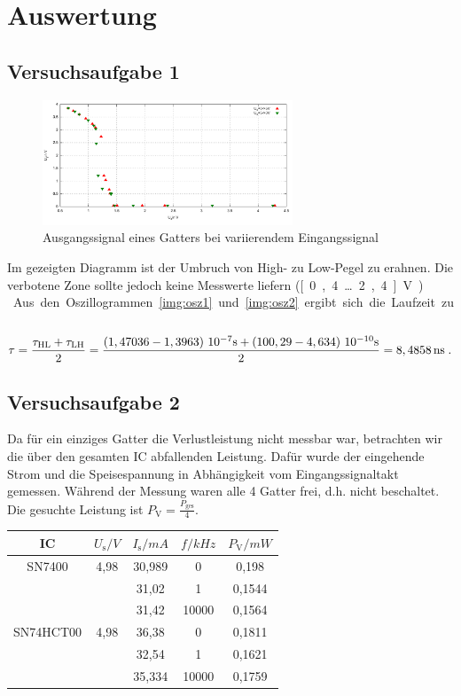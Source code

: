 \documentclass[numbers=noenddot,12pt,a4paper]{scrartcl}
\newcommand{\ix}[1]{_\text{#1}}
\begin{document}
\section{Auswertung}
\subsection{Versuchsaufgabe 1}
\begin{figure}[H]
\centering
\includegraphics[width=0.666\textwidth]{aufg1.pdf}
\caption{Ausgangssignal eines Gatters bei variierendem Eingangssignal}
\end{figure}
Im gezeigten Diagramm ist der Umbruch von High- zu Low-Pegel zu erahnen. Die verbotene Zone sollte jedoch keine Messwerte liefern (\unit[0,4\dots 2,4]{V}). \\
Aus den Oszillogrammen \ref{img:osz1} und \ref{img:osz2} ergibt sich die Laufzeit zu
\begin{align*}
\tau=\frac{\tau\ix{HL}+\tau\ix{LH}}{2}=\frac{\unit[\left(1,47036-1,3963\right)]{10^{-7}s}+\unit[\left(100,29-4,634\right)]{10^{-10}s}}{2}=\unit[8,4858]{ns} \; .
\end{align*}
\subsection{Versuchsaufgabe 2}
Da für ein einziges Gatter die Verlustleistung nicht messbar war, betrachten wir die über den gesamten IC abfallenden Leistung. Dafür wurde der eingehende Strom und die Speisespannung in Abhängigkeit vom Eingangssignaltakt gemessen. Während der Messung waren alle 4 Gatter frei, d.h. nicht beschaltet. Die gesuchte Leistung ist $P\ix{V}=\frac{P\ix{ges}}{4}$.
\begin{table}[H]
\centering
\begin{tabular}{c||c|c|c|c}
 IC & $U\ix{s}\unit{/V}$ & $I\ix{s}\unit{/mA}$ & $f\unit{/kHz}$ & $P\ix{V}\unit{/mW}$ \\ \hline \hline 
SN7400 & 4,98 & 30,989 & 0 & 0,198\\ \cline{3-5}
 &  & 31,02 & 1 & 0,1544 \\ \cline{3-5}
 &  & 31,42 & 10000 & 0,1564 \\ \cline{1-5}
SN74HCT00 & 4,98 & 36,38 & 0 & 0,1811 \\ \cline{3-5}
 &  & 32,54 & 1 & 0,1621 \\ \cline{3-5}
 &  & 35,334 & 10000 & 0,1759
\end{tabular} 
\end{table}
\end{document}
